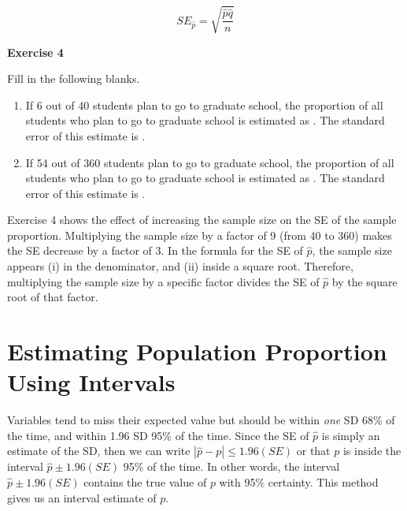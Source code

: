 \documentclass[11pt]{book}\usepackage[]{graphicx}\usepackage[]{color}
\begin{document}
\vspace{3mm}

\begin{equation*}
SE_{\hat{p}} = \sqrt{\frac{\hat{p}\hat{q}}{n}}
\end{equation*}

\begin{minipage}[ht]{29mm}

\vspace{-20mm}

\textbf{Exercise 4}
\end{minipage}
\begin{minipage}[ht]{109mm}

{\parbox{108mm}{
Fill in the following blanks.

\begin{enumerate}
\item If 6 out of 40 students plan to go to graduate school, the proportion of all students who plan to go to graduate school is estimated as \underline{\phantom{xxxxxxx}}.  The standard error of this estimate is \underline{\phantom{xxxxxxx}}.
\item If 54 out of 360 students plan to go to graduate school, the proportion of all students who plan to go to graduate school is estimated as \underline{\phantom{xxxxxxx}}.  The standard error of this estimate is \underline{\phantom{xxxxxxx}}.
\end{enumerate}

}}

\end{minipage}

Exercise 4 shows the effect of increasing the sample size on the SE of the sample proportion.  Multiplying the sample size by a factor of 9 (from 40 to 360) makes the SE decrease by a factor of 3.  In the formula for the SE of $\hat{p}$,  the sample size appears (i) in the denominator, and (ii) inside a square root.  Therefore, multiplying the sample size by a specific factor divides the SE of $\hat{p}$ by the square root of that factor.


\section{Estimating Population Proportion Using Intervals}

Variables tend to miss their expected value but should be within \textit{one} SD 68\% of the time, and within 1.96 SD 95\% of the time.  Since the SE of $\hat{p}$ is simply an estimate of the SD, then we can write $| \hat{p} - p | \le 1.96(SE)$ or that $p$ is inside the interval $\hat{p} \pm 1.96(SE)$ 95\% of the time.  In other words, the interval $\hat{p} \pm 1.96(SE)$ contains the true value of $p$ with 95\% certainty.  This method gives us an interval estimate of $p$.
\end{document}
